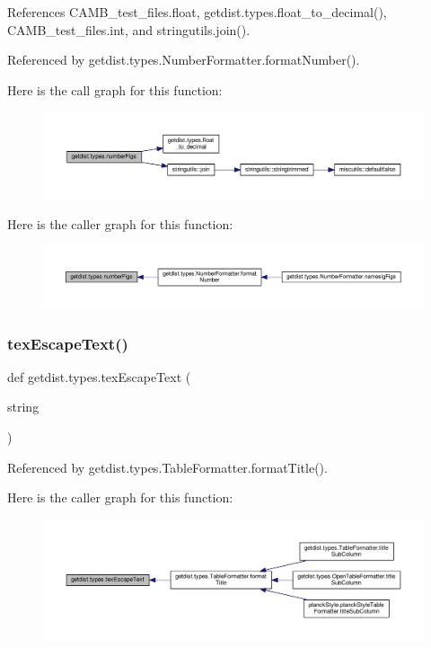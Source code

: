 References C\+A\+M\+B\+\_\+test\+\_\+files.\+float, getdist.\+types.\+float\+\_\+to\+\_\+decimal(), C\+A\+M\+B\+\_\+test\+\_\+files.\+int, and stringutils.\+join().



Referenced by getdist.\+types.\+Number\+Formatter.\+format\+Number().

Here is the call graph for this function\+:
\nopagebreak
\begin{figure}[H]
\begin{center}
\leavevmode
\includegraphics[width=350pt]{namespacegetdist_1_1types_a4829adc4cab4c2f830294abfac22ecf7_cgraph}
\end{center}
\end{figure}
Here is the caller graph for this function\+:
\nopagebreak
\begin{figure}[H]
\begin{center}
\leavevmode
\includegraphics[width=350pt]{namespacegetdist_1_1types_a4829adc4cab4c2f830294abfac22ecf7_icgraph}
\end{center}
\end{figure}
\mbox{\label{namespacegetdist_1_1types_a3ada89ff8f21a7f0e9d62c2c3b4607c4}} 
\subsubsection{\texorpdfstring{tex\+Escape\+Text()}{texEscapeText()}}
{\footnotesize\ttfamily def getdist.\+types.\+tex\+Escape\+Text (\begin{DoxyParamCaption}\item[{}]{string }\end{DoxyParamCaption})}



Referenced by getdist.\+types.\+Table\+Formatter.\+format\+Title().

Here is the caller graph for this function\+:
\nopagebreak
\begin{figure}[H]
\begin{center}
\leavevmode
\includegraphics[width=350pt]{namespacegetdist_1_1types_a3ada89ff8f21a7f0e9d62c2c3b4607c4_icgraph}
\end{center}
\end{figure}
